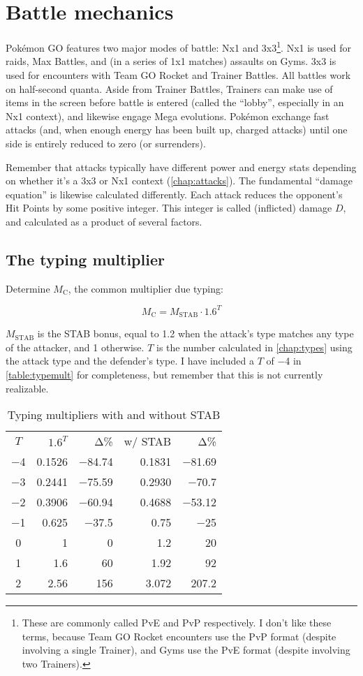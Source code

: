 \chapter{Battle mechanics\label{chap:battle}}
\nopagecolor
Pokémon GO features two major modes of battle: Nx1 and 3x3\footnote{These are commonly called PvE and PvP
 respectively. I don't like these terms, because Team GO Rocket encounters use the PvP format (despite involving
 a single Trainer), and Gyms use the PvE format (despite involving two Trainers).}.
Nx1 is used for raids, Max Battles, and (in a series of 1x1 matches) assaults on Gyms.
3x3 is used for encounters with Team GO Rocket and Trainer Battles.
All battles work on half-second quanta.
Aside from Trainer Battles, Trainers can make use of items in the screen before
  battle is entered (called the ``lobby'', especially in an Nx1 context), and
  likewise engage Mega evolutions.
Pokémon exchange fast attacks (and, when enough energy has been built up, charged attacks)
  until one side is entirely reduced to zero \HP{} (or surrenders).

Remember that attacks typically have different power and energy stats depending on
  whether it's a 3x3 or Nx1 context (\autoref{chap:attacks}).
The fundamental ``damage equation'' is likewise calculated differently.
Each attack reduces the opponent's Hit Points by some positive integer.
This integer is called (inflicted) damage $D$, and calculated as a product of several factors.

\section{The typing multiplier\label{sec:typemult}}
Determine $M_\mathrm{C}$, the common multiplier due typing:

\[ M_\mathrm{C} = M_\mathrm{STAB} \cdot 1.6^{T} \]

$M_\mathrm{STAB}$ is the STAB bonus, equal to 1.2 when the attack's type matches any
  type of the attacker, and 1 otherwise.
$T$ is the number calculated in \autoref{chap:types} using the attack type
 and the defender's type.
I have included a $T$ of −4 in \autoref{table:typemult} for completeness,
 but remember that this is not currently realizable.

\begin{table}
\centering
\begin{tabular}{c r r r r}
$T$ & $1.6^{T}$ & Δ\% & w/ STAB & Δ\% \\
\Midrule
−4 & 0.1526 & −84.74 & 0.1831 & −81.69 \\
−3 & 0.2441 & −75.59 & 0.2930 & −70.7 \\
−2 & 0.3906 & −60.94 & 0.4688 & −53.12 \\
−1 & 0.625 & −37.5 & 0.75 & −25 \\
0 & 1 & 0 & 1.2 & 20 \\
1 & 1.6 & 60 & 1.92 & 92 \\
2 & 2.56 & 156 & 3.072 & 207.2 \\
\end{tabular}
\caption{Typing multipliers with and without STAB\label{table:typemult}}
\end{table}

